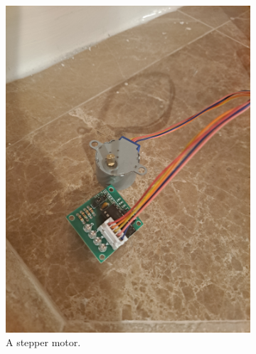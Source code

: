 \documentclass[11pt]{article}
\begin{document}
\begin{figure}[h!]
\begin{subfigure}[b]{0.3\textwidth}
    \includegraphics[width=\textwidth]{MotorImg.jpg}
    \caption{A stepper motor.}
    \label{fig:figure2}
\end{subfigure}
\hfill
\begin{subfigure}[b]{0.3\textwidth}
    \centering

\end{subfigure}
\end{figure}
\end{document}
